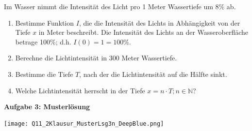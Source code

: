 \documentclass[a4paper,12pt]{article}
\newcommand{\Aufgabe}[1]{
  {
  \vspace*{0.5cm}
  \textsf{\textbf{Aufgabe #1}}
  \vspace*{0.2cm}
  
  }
}
\begin{document}
Im Wasser nimmt die Intensität des Licht pro 1 Meter Wassertiefe um 8\% ab.

\begin{enumerate}[label={\alph*)}]
  \item Bestimme Funktion $I$, die die Intensität des Lichts in Abhängigkeit von der Tiefe $x$ in Meter beschreibt. Die Intensität des Lichts an der Wasseroberfläche betrage 100\%; d.h. $I(0)=1=100\%$.

  \item Berechne die Lichtintensität in 300 Meter Wassertiefe.

  \item Bestimme die Tiefe $T$, nach der die Lichtintensität auf die Hälfte sinkt. 
  \item Welche Lichtintensität herrscht in der Tiefe $x = n\cdot T; n \in \mathbb{N}$?
\end{enumerate}


\newpage
\Aufgabe{3: Musterlösung}
\texttt{[image: Q11\_2Klausur\_MusterLsg3n\_DeepBlue.png]}

\end{document}
